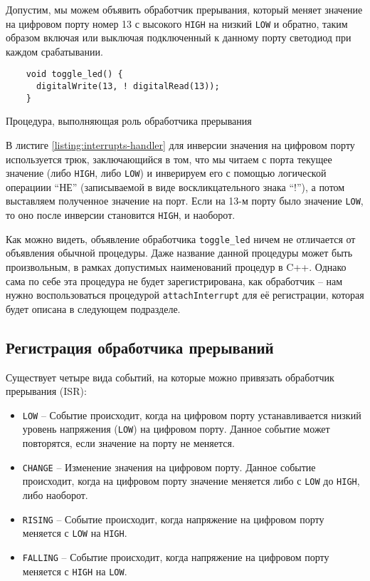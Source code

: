 \documentclass[../sparc.tex]{subfiles}
\begin{document}
Допустим, мы можем объявить обработчик прерывания, который меняет значение на
цифровом порту номер 13 с высокого \texttt{HIGH} на низкий \texttt{LOW} и
обратно, таким образом включая или выключая подключенный к данному порту
светодиод при каждом срабатывании.

\begin{listing}[ht]
  \begin{verbatim}
    void toggle_led() {
      digitalWrite(13, ! digitalRead(13));
    }
  \end{verbatim}
  \caption{Процедура, выполняющая роль обработчика прерывания}
  \label{listing:interrupts-handler}
\end{listing}

В листиге \ref{listing:interrupts-handler} для инверсии значения на цифровом
порту используется трюк, заключающийся в том, что мы читаем с порта текущее
значение (либо \texttt{HIGH}, либо \texttt{LOW}) и инверируем его с помощью
логической операциии ``НЕ'' (записываемой в виде воскликцательного знака ``!''),
а потом выставляем полученное значение на порт.  Если на 13-м порту было
значение \texttt{LOW}, то оно после инверсии становится \texttt{HIGH}, и
наоборот.

Как можно видеть, объявление обработчика \texttt{toggle\_led} ничем не
отличается от объявления обычной процедуры.  Даже название данной процедуры
может быть произвольным, в рамках допустимых наименований процедур в C++.
Однако сама по себе эта процедура не будет зарегистрирована, как обработчик --
нам нужно воспользоваться процедурой \texttt{attachInterrupt} для её
регистрации, которая будет описана в следующем подразделе.

\subsection{Регистрация обработчика прерываний}

Существует четыре вида событий, на которые можно привязать обработчик прерывания
(\gls{ISR}):
\begin{itemize}
\item \texttt{LOW} -- Событие происходит, когда на цифровом порту устанавливается
  низкий уровень напряжения (\texttt{LOW}) на цифровом порту.  Данное событие
  может повторятся, если значение на порту не меняется.
\item \texttt{CHANGE} -- Изменение значения на цифровом порту.  Данное событие
  происходит, когда на цифровом порту значение меняется либо с \texttt{LOW} до
  \texttt{HIGH}, либо наоборот.
\item \texttt{RISING} -- Событие происходит, когда напряжение на цифровом порту
  меняется с \texttt{LOW} на \texttt{HIGH}.
\item \texttt{FALLING} -- Событие происходит, когда напряжение на цифровом порту
  меняется с \texttt{HIGH} на \texttt{LOW}.
\end{itemize}
\end{document}
